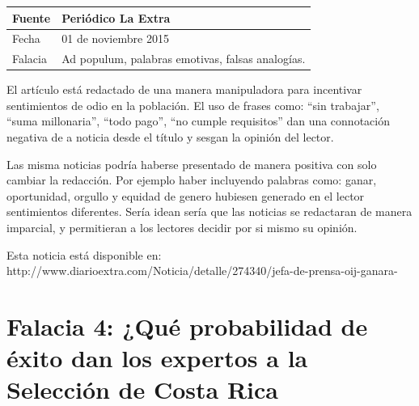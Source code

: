 \documentclass[times]{simauth}
\begin{document}
\newpage

\begin{table}[h!]
    \begin{tabular}{ll} 
        \toprule[1.5pt]
        Fuente & Periódico La Extra\\
        \midrule[0.5pt]
        Fecha  & 01 de noviembre 2015\\
        \midrule[0.5pt]
        Falacia & Ad populum, palabras emotivas, falsas analogías. \\
        \bottomrule[1.5pt]
    \end{tabular} 
\end{table}

El artículo está redactado de una manera manipuladora para incentivar sentimientos de odio en la población.  El uso de frases como: “sin trabajar”, “suma millonaria”, “todo pago”, “no cumple requisitos” dan una connotación negativa de a noticia desde el título y  sesgan la opinión del lector.

Las misma noticias podría haberse presentado de manera positiva con solo cambiar la redacción. Por ejemplo haber incluyendo palabras como: ganar, oportunidad, orgullo y equidad de genero hubiesen generado en el lector sentimientos diferentes. 
Sería idean sería que las noticias se redactaran de manera imparcial, y permitieran a los lectores decidir por si mismo su opinión. 

Esta noticia está disponible en: http://www.diarioextra.com/Noticia/detalle/274340/jefa-de-prensa-oij-ganara-%


\newpage
\section{Falacia 4: ¿Qué probabilidad de éxito dan los expertos a la Selección de Costa Rica}
\end{document}
